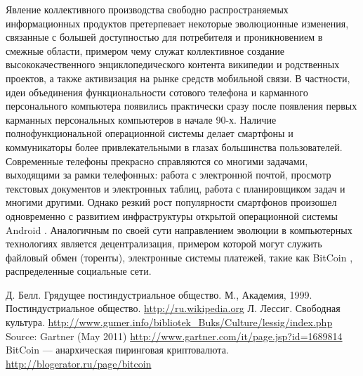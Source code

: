 \documentclass[10pt, a5paper]{article}
\begin{document}
Явление коллективного производства свободно распространяемых информационных продуктов претерпевает некоторые эволюционные изменения, связанные с большей доступностью для потребителя и проникновением в смежные области, примером чему служат коллективное создание высококачественного энциклопедического контента википедии и родственных проектов, а также активизация на рынке средств мобильной связи. В частности, идеи объединения функциональности сотового телефона и карманного персонального компьютера появились практически сразу после появления первых карманных персональных компьютеров в начале 90-х. Наличие полнофункциональной операционной системы делает смартфоны и коммуникаторы более привлекательными в глазах большинства пользователей. Современные телефоны прекрасно справляются со многими задачами, выходящими за рамки телефонных: работа с электронной почтой, просмотр текстовых документов и электронных таблиц, работа с планировщиком задач и многими другими. Однако резкий рост популярности смартфонов произошел одновременно с развитием инфраструктуры открытой операционной системы Android \cite{ivanova4}.
Аналогичным по своей сути направлением эволюции в компьютерных технологиях является децентрализация, примером которой могут служить файловый обмен (торенты), электронные системы платежей, такие как BitCoin \cite{ivanova5}, распределенные социальные сети.

\begin{thebibliography}{9}
	 Д. Белл. Грядущее постиндустриальное общество. М., Академия, 1999.
	 Постиндустриальное общество. \url{http://ru.wikipedia.org}  
	 Л. Лессиг. Свободная культура. \url{http://www.gumer.info/bibliotek_Buks/Culture/lessig/index.php}
	 Source: Gartner (May 2011) \url{http://www.gartner.com/it/page.jsp?id=1689814}
	 BitCoin --- анархическая пиринговая криптовалюта. \url{http://blogerator.ru/page/bitcoin}
\end{thebibliography}
\end{document}
